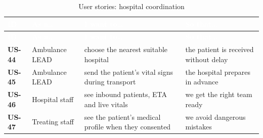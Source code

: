 {\tabfont\rowband
\begin{longtable}{@{}>{\raggedright\arraybackslash}p{}>{\raggedright\arraybackslash}p{}>{\raggedright\arraybackslash}p{}>{\raggedright\arraybackslash}p{}@{}}
\caption{User stories: hospital coordination}\label{tab:us-hos}\\
\rowcolor{najdanavy}\textcolor{white}{\sffamily\bfseries\small ID} & \textcolor{white}{\sffamily\bfseries\small As a\ldots{}} & \textcolor{white}{\sffamily\bfseries\small I want to\ldots{}} & \textcolor{white}{\sffamily\bfseries\small So that\ldots{}}\\
\endfirsthead
\rowcolor{najdanavy}\textcolor{white}{\sffamily\bfseries\small ID} & \textcolor{white}{\sffamily\bfseries\small As a\ldots{}} & \textcolor{white}{\sffamily\bfseries\small I want to\ldots{}} & \textcolor{white}{\sffamily\bfseries\small So that\ldots{}}\\
\endhead
\bottomrule\endlastfoot
\textbf{US-44} & Ambulance LEAD & choose the nearest suitable hospital & the patient is received without delay\\
\textbf{US-45} & Ambulance LEAD & send the patient’s vital signs during transport & the hospital prepares in advance\\
\textbf{US-46} & Hospital staff & see inbound patients, ETA and live vitals & we get the right team ready\\
\textbf{US-47} & Treating staff & see the patient’s medical profile when they consented & we avoid dangerous mistakes\\
\end{longtable}}
